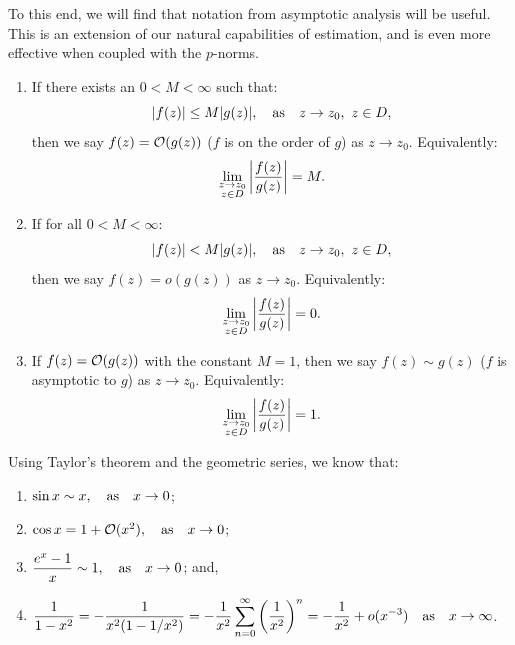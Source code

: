 To this end, we will find that notation from asymptotic analysis will be useful. This is an extension of our natural capabilities of estimation, and is even more effective when coupled with the $p$-norms.

\begin{definition}
\begin{enumerate}
\item If there exists an $0<M<\infty$ such that:
\begin{equation}
|f(z)| \le M|g(z)|,\quad{\rm as}\quad z\to z_0,~z\in D,
\end{equation}
then we say $f(z) = \mathcal{O}(g(z))$ ($f$ is on the order of $g$) as $z\to z_0$. Equivalently:
\begin{equation}
\lim_{\substack{z\to z_0\\z\in D}}\left|{\dfrac{f(z)}{g(z)}}\right| = M.
\end{equation}
\item If for all $0<M<\infty$:
\begin{equation}
|f(z)| < M|g(z)|,\quad{\rm as}\quad z\to z_0,~z\in D,
\end{equation}
then we say $f(z) = o(g(z))$ as $z\to z_0$. Equivalently:
\begin{equation}
\lim_{\substack{z\to z_0\\z\in D}}\left|{\dfrac{f(z)}{g(z)}}\right| = 0.
\end{equation}
\item If $f(z) = \mathcal{O}(g(z))$ with the constant $M=1$, then we say $f(z) \sim g(z)$ ($f$ is asymptotic to $g$) as $z\to z_0$. Equivalently:
\begin{equation}
\lim_{\substack{z\to z_0\\z\in D}}\left|{\dfrac{f(z)}{g(z)}}\right| = 1.
\end{equation}
\end{enumerate}
\end{definition}

\begin{example}
Using Taylor's theorem and the geometric series, we know that:
\begin{enumerate}
\item $\sin x \sim x,\quad{\rm as}\quad x\to0$;
\item $\cos x = 1 + \mathcal{O}(x^2),\quad{\rm as}\quad x\to0$;
\item $\dfrac{e^x-1}{x} \sim 1,\quad{\rm as}\quad x\to0$; and,
\item $\displaystyle \dfrac{1}{1-x^2} = -\dfrac{1}{x^2(1-1/x^2)} = -\dfrac{1}{x^2}\sum_{n=0}^\infty\left(\dfrac{1}{x^2}\right)^n = -\dfrac{1}{x^2}+o(x^{-3})\quad{\rm as}\quad x\to\infty$.
\end{enumerate}
\end{example}

